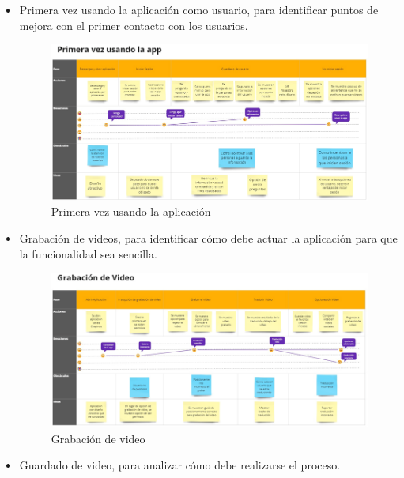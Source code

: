 \begin{itemize}
    \item Primera vez usando la aplicación como usuario, para identificar puntos de mejora con el primer contacto con los usuarios.

    
    \begin{figure} [H]
        \centering
        \includegraphics[width=1.1\linewidth]{figuras/mapa_exp1.png}
        \caption{Primera vez usando la aplicación}
        \label{fig:enter-label}
    \end{figure}

    
    \item Grabación de videos, para identificar cómo debe actuar la aplicación para que la funcionalidad sea sencilla.

    \begin{figure} [H]
        \centering
        \includegraphics[width=1\linewidth]{figuras/mapa_exp2.png}
        \caption{Grabación de video}
        \label{fig:enter-label}
    \end{figure}
    
    \item Guardado de video, para analizar cómo debe realizarse el proceso.


\end{itemize}
